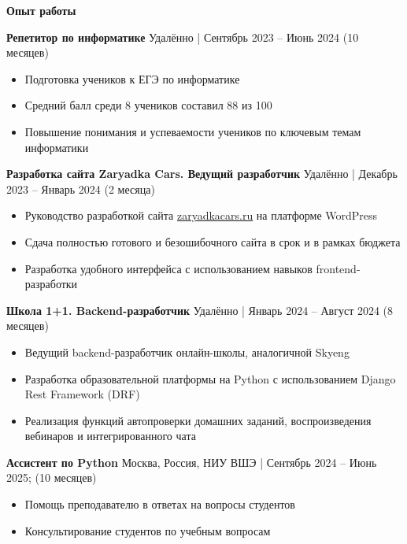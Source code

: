 \begin{center}
    \textbf{Опыт работы}
\end{center}

\textbf{Репетитор по информатике} \hfill Удалённо | Сентябрь 2023 – Июнь 2024 (10 месяцев)
\begin{itemize}[noitemsep, topsep=0pt, partopsep=0pt, parsep=0pt]
    \item Подготовка учеников к ЕГЭ по информатике
    \item Средний балл среди 8 учеников составил 88 из 100
    \item Повышение понимания и успеваемости учеников по ключевым темам информатики
\end{itemize}

\textbf{Разработка сайта Zaryadka Cars. Ведущий разработчик} \hfill Удалённо | Декабрь 2023 – Январь 2024 (2 месяца)
\begin{itemize}[noitemsep, topsep=0pt, partopsep=0pt, parsep=0pt]
    \item Руководство разработкой сайта \href{https://zaryadkacars.ru}{zaryadkacars.ru} на платформе WordPress
    \item Сдача полностью готового и безошибочного сайта в срок и в рамках бюджета
    \item Разработка удобного интерфейса с использованием навыков frontend-разработки
\end{itemize}

\textbf{Школа 1+1. Backend-разработчик} \hfill Удалённо | Январь 2024 – Август 2024 (8 месяцев)
\begin{itemize}[noitemsep, topsep=0pt, partopsep=0pt, parsep=0pt]
    \item Ведущий backend-разработчик онлайн-школы, аналогичной Skyeng
    \item Разработка образовательной платформы на Python с использованием Django Rest Framework (DRF)
    \item Реализация функций автопроверки домашних заданий, воспроизведения вебинаров и интегрированного чата
\end{itemize}

\textbf{Ассистент по Python} \hfill Москва, Россия, НИУ ВШЭ | Сентябрь 2024 – Июнь 2025; (10 месяцев)
\begin{itemize}[noitemsep, topsep=0pt, partopsep=0pt, parsep=0pt]
    \item Помощь преподавателю в ответах на вопросы студентов
    \item Консультирование студентов по учебным вопросам
\end{itemize}

